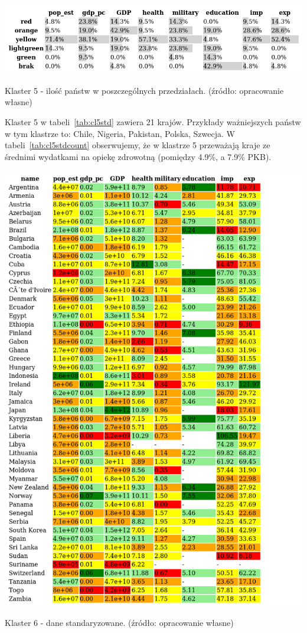 \documentclass[11pt]{report}
\begin{document}
    \begin{table}[!htp]
        \centering
        \includegraphics[width=\linewidth]{tables/CLUST/cluster5stdkmeanscount.png}
        \caption{Klaster 5 - ilość państw w poszczególnych przedziałach. (źródło: opracowanie własne)}
        \label{tab:cl5stdcount}
    \end{table}

    Klaster 5 w tabeli~\ref{tab:cl5std} zawiera 21 krajów.
    Przykłady ważniejszych państw w tym klastrze to: Chile, Nigeria, Pakistan, Polska, Szwecja.
    W tabeli~\ref{tab:cl5stdcount} obserwujemy, że w klastrze 5 przeważają kraje ze średnimi wydatkami na opiekę zdrowotną (pomiędzy 4.9\%, a 7.9\% PKB).

    \begin{table}[!htp]
        \centering
        \includegraphics[width=\linewidth]{tables/CLUST/cluster6stdkmeans.png}
        \caption{Klaster 6 - dane standaryzowane. (źródło: opracowanie własne)}
        \label{tab:cl6std}
    \end{table}
\end{document}

